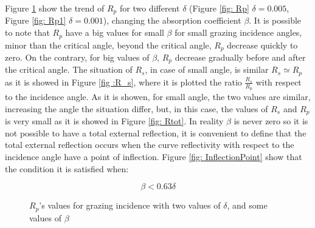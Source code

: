 \begin{flushleft}
Figure \ref{fig :R_p} show the trend of $R_p $ for two different $\delta $ (Figure \ref{fig: Rp} $\delta = 0.005$, Figure \ref{fig: Rp1} $\delta = 0.001$), changing the absorption coefficient $\beta $. It is possible to note that $R_p $ have a big values for small $\beta $ for small grazing incidence angles, minor than the critical angle, beyond the critical angle, $R_p $ decrease quickly to zero. On the contrary, for big values of $\beta $, $R_p $ decrease gradually before and after the critical angle. The situation of $R_s $, in case of small angle, is similar $R_s \simeq R_p $ as it is showed in Figure \ref{fig :R_s}, where it is plotted the ratio $\frac{R_s}{R_p} $ with respect to the incidence angle. As it is showen, for small angle, the two values are similar, increasing the angle the situation differ, but, in this case, the values of $R_s $ and $R_p $ is very small as it is showed in Figure \ref{fig: Rtot}. In reality $\beta $ is never zero so it is not possible to have a total external reflection, it is convenient to define that the total external reflection occurs when the curve reflectivity with respect to the incidence angle have a point of inflection. Figure \ref{fig: InflectionPoint} show that the condition it is satisfied when: 
\end{flushleft}
\begin{equation}
\beta < 0.63 \delta
\label{eq: last}
\end{equation}
\begin{figure}[]
%
\centering
%
\quad
%
%
\caption{$R_p$'s values for grazing incidence with two values of $\delta $, and some values of $\beta $}
\label{fig :R_p}
%
\end{figure}
